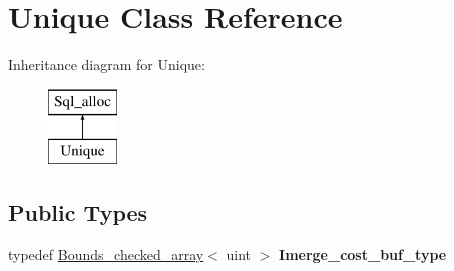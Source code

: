 \hypertarget{classUnique}{}\section{Unique Class Reference}
\label{classUnique}
Inheritance diagram for Unique\+:\begin{figure}[H]
\begin{center}
\leavevmode
\includegraphics[height=2.000000cm]{classUnique}
\end{center}
\end{figure}
\subsection*{Public Types}
\begin{DoxyCompactItemize}
\item 
\mbox{\label{classUnique_a9f584d0ad6b0928f710664f5f052a5e6}} 
typedef \mbox{\hyperlink{classBounds__checked__array}{Bounds\+\_\+checked\+\_\+array}}$<$ uint $>$ {\bfseries Imerge\+\_\+cost\+\_\+buf\+\_\+type}
\end{DoxyCompactItemize}
